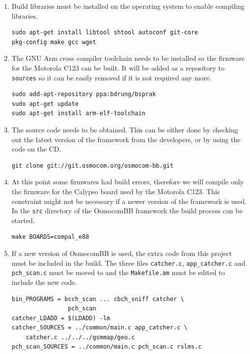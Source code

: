 \begin{enumerate}
	\item Build libraries must be installed on the operating system to enable compiling libraries.
\begin{verbatim}
sudo apt-get install libtool shtool autoconf git-core
pkg-config make gcc wget
\end{verbatim}
	\item The GNU Arm cross compiler toolchain needs to be installed so the firmware for the Motorola C123 can be built.
	It will be added as a repository to \texttt{sources} so it can be easily removed if it is not required any more.
	\begin{verbatim}
sudo add-apt-repository ppa:bdrung/bsprak
sudo apt-get update
sudo apt-get install arm-elf-toolchain
	\end{verbatim}
	\item The source code needs to be obtained.
	This can be either done by checking out the latest version of the framework from the developers, or by using the code on the CD.
\begin{verbatim}
git clone git://git.osmocom.org/osmocom-bb.git
\end{verbatim}
	\item At this point some firmwares had build errors, therefore we will compile only the firmware for the Calypso board used by the Motorola C123.
	This constraint might not be necessary if a newer version of the framework is used.
	In the \texttt{src} directory of the OsmocomBB framework the build process can be started.
	\begin{verbatim}
make BOARDS=compal_e88
	\end{verbatim}
	\item If a new version of OsmocomBB is used, the extra code from this project must be included in the build.
	The three files \texttt{catcher.c}, \texttt{app\_catcher.c} and \texttt{pch\_scan.c} must be moved to  and the \texttt{Makefile.am} must be edited to include the new code.
	\begin{verbatim}
bin_PROGRAMS = bcch_scan ... cbch_sniff catcher \
				pch_scan
catcher_LDADD = $(LDADD) -lm
catcher_SOURCES = ../common/main.c app_catcher.c \ 
	catcher.c ../../../gsmmap/geo.c
pch_scan_SOURCES = ../common/main.c pch_scan.c rslms.c
	\end{verbatim}
\end{enumerate}

